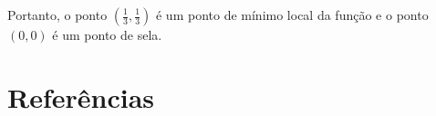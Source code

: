 \documentclass[
  letterpaper,
  DIV=11,
  numbers=noendperiod]{scrreprt}
\begin{document}
Portanto, o ponto \((\frac{1}{3},\frac{1}{3})\) é um ponto de mínimo
local da função e o ponto \((0,0)\) é um ponto de sela.


\chapter*{Referências}\label{referuxeancias}


\printbibliography[heading=none]




\printindex
\end{document}

